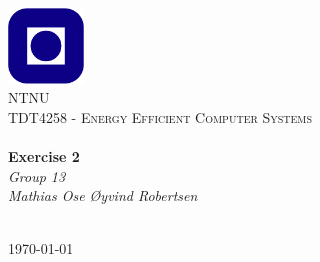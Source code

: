 \begin{titlepage}
\begin{center}
\includegraphics[width=0.15\textwidth]{img/ntnulogo.PNG}~\\[1cm]

\textsc{\LARGE NTNU}\\[1.5cm]

\textsc{\Large TDT4258 - Energy Efficient Computer Systems}\\[0.5cm]

\HRule \\[0.4cm]
{ \huge \bfseries Exercise 2}\\[0.5cm]
{\Large \textit{Group 13}}\\[0.3cm]
{\large \textit{Mathias Ose  \O yvind Robertsen}}\\[0.2cm]
\HRule \\[1.5cm]



\vfill

{\large \today}
\end{center}
\end{titlepage}
